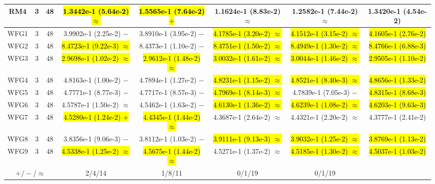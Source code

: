 \documentclass[journal]{IEEEtran}
\begin{document}
\begin{table*}[htbp]
\begin{tabular}{cccccccc}
\hline
\multirow{1}{*}{RM4}&3&48&\hl{1.3442e-1 (5.64e-2) $\approx$}&\hl{1.5565e-1 (7.64e-2) $+$}&1.1624e-1 (8.83e-2) $\approx$&1.2582e-1 (7.44e-2) $\approx$&1.3420e-1 (4.54e-2)\\
\hline
\multirow{1}{*}{WFG1}&3&48&3.9902e-1 (2.25e-2) $-$&3.8910e-1 (3.95e-2) $-$&\hl{4.1785e-1 (3.20e-2) $\approx$}&\hl{4.1512e-1 (3.15e-2) $\approx$}&\hl{4.1605e-1 (2.76e-2)}\\
\hline
\multirow{1}{*}{WFG2}&3&48&\hl{8.4723e-1 (9.22e-3) $\approx$}&8.4373e-1 (1.10e-2) $-$&\hl{8.4751e-1 (1.50e-2) $\approx$}&\hl{8.4949e-1 (1.30e-2) $\approx$}&\hl{8.4766e-1 (6.88e-3)}\\
\hline
\multirow{1}{*}{WFG3}&3&48&\hl{2.9698e-1 (1.02e-2) $\approx$}&\hl{2.9612e-1 (1.48e-2) $\approx$}&\hl{3.0032e-1 (1.61e-2) $\approx$}&\hl{3.0044e-1 (1.46e-2) $\approx$}&\hl{2.9505e-1 (1.10e-2)}\\
\hline
\multirow{1}{*}{WFG4}&3&48&4.8163e-1 (1.00e-2) $-$&4.7894e-1 (1.27e-2) $-$&\hl{4.8231e-1 (1.15e-2) $\approx$}&\hl{4.8521e-1 (8.40e-3) $\approx$}&\hl{4.8656e-1 (1.33e-2)}\\
\hline
\multirow{1}{*}{WFG5}&3&48&4.7771e-1 (8.77e-3) $-$&4.7717e-1 (8.57e-3) $-$&\hl{4.7969e-1 (8.14e-3) $\approx$}&4.7839e-1 (7.05e-3) $-$&\hl{4.8315e-1 (8.68e-3)}\\
\hline
\multirow{1}{*}{WFG6}&3&48&4.5787e-1 (1.50e-2) $\approx$&4.5462e-1 (1.63e-2) $-$&\hl{4.6130e-1 (1.36e-2) $\approx$}&\hl{4.6239e-1 (1.08e-2) $\approx$}&\hl{4.6203e-1 (9.63e-3)}\\
\hline
\multirow{1}{*}{WFG7}&3&48&\hl{4.5280e-1 (1.24e-2) $+$}&\hl{4.4345e-1 (1.44e-2) $\approx$}&4.3687e-1 (2.64e-2) $\approx$&4.4321e-1 (2.20e-2) $\approx$&4.3777e-1 (2.41e-2)\\
\hline
\multirow{1}{*}{WFG8}&3&48&3.8356e-1 (9.06e-3) $-$&3.8112e-1 (1.03e-2) $-$&\hl{3.9111e-1 (9.13e-3) $\approx$}&\hl{3.9032e-1 (1.25e-2) $\approx$}&\hl{3.8769e-1 (1.13e-2)}\\
\hline
\multirow{1}{*}{WFG9}&3&48&\hl{4.5338e-1 (1.25e-2) $\approx$}&\hl{4.5675e-1 (1.44e-2) $\approx$}&4.5271e-1 (1.37e-2) $\approx$&\hl{4.5185e-1 (1.30e-2) $\approx$}&\hl{4.5037e-1 (1.03e-2)}\\
\hline
\multicolumn{3}{c}{$+/-/\approx$}&2/4/14&1/8/11&0/1/19&0/1/19&\\
\bottomrule
\end{tabular}
\label{No Label}
\end{table*}
\end{document}
